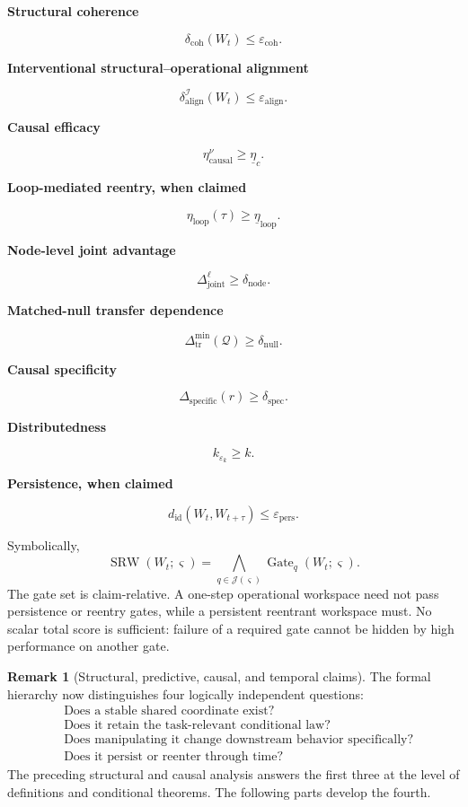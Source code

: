 \documentclass[11pt,letterpaper]{article}
\newcommand{\SRW}{\operatorname{SRW}}
\newcommand{\subtopic}[1]{%
 \vspace{0.45em}
 {\bfseries\color{AccentColor} #1\par}
}
\theoremstyle{plain}
\theoremstyle{definition}
\newtheorem{remark}[theorem]{Remark}
\begin{document}
\subtopic{Structural coherence}
\[
\delta_{\mathrm{coh}}(W_t)
\leq
\varepsilon_{\mathrm{coh}}.
\]

\subtopic{Interventional structural--operational alignment}
\[
\delta_{\mathrm{align}}^{\mathcal I}(W_t)
\leq
\varepsilon_{\mathrm{align}}.
\]

\subtopic{Causal efficacy}
\[
\eta_{\mathrm{causal}}^\nu
\geq
\underline\eta_c.
\]

\subtopic{Loop-mediated reentry, when claimed}
\[
\eta_{\mathrm{loop}}(\tau)
\geq
\underline\eta_{\mathrm{loop}}.
\]

\subtopic{Node-level joint advantage}
\[
\Delta_{\mathrm{joint}}^{\ell}
\geq
\delta_{\mathrm{node}}.
\]

\subtopic{Matched-null transfer dependence}
\[
\Delta_{\mathrm{tr}}^{\min}(\mathcal Q)
\geq
\delta_{\mathrm{null}}.
\]

\subtopic{Causal specificity}
\[
\Delta_{\mathrm{specific}}(r)
\geq
\delta_{\mathrm{spec}}.
\]

\subtopic{Distributedness}
\[
k_{\varepsilon_k}
\geq
k.
\]

\subtopic{Persistence, when claimed}
\[
d_{\mathrm{id}}(W_t,W_{t+\tau})
\leq
\varepsilon_{\mathrm{pers}}.
\]

Symbolically,
\[
\boxed{
\SRW(W_t;\varsigma)
=
\bigwedge_{q\in\mathcal J(\varsigma)}
\operatorname{Gate}_q(W_t;\varsigma).
}
\]
The gate set is claim-relative. A one-step operational workspace need not pass
persistence or reentry gates, while a persistent reentrant workspace must.
No scalar total score is sufficient: failure of a required gate cannot be
hidden by high performance on another gate.

\begin{remark}[Structural, predictive, causal, and temporal claims]
The formal hierarchy now distinguishes four logically independent questions:
\[
\begin{aligned}
&\text{Does a stable shared coordinate exist?}\\
&\text{Does it retain the task-relevant conditional law?}\\
&\text{Does manipulating it change downstream behavior specifically?}\\
&\text{Does it persist or reenter through time?}
\end{aligned}
\]
The preceding structural and causal analysis answers the first three at the level of definitions and conditional
theorems. The following parts develop the fourth.
\end{remark}
\end{document}
